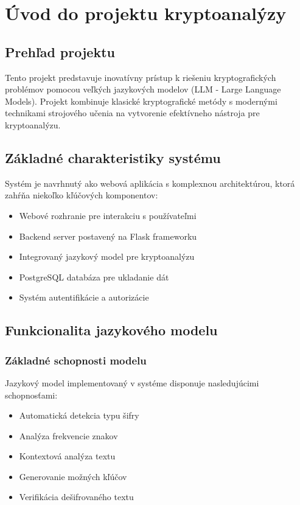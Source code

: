 \chapter{Úvod do projektu kryptoanalýzy}

\section{Prehľad projektu}
Tento projekt predstavuje inovatívny prístup k riešeniu kryptografických problémov pomocou veľkých jazykových modelov (LLM - Large Language Models). Projekt kombinuje klasické kryptografické metódy s modernými technikami strojového učenia na vytvorenie efektívneho nástroja pre kryptoanalýzu.

\section{Základné charakteristiky systému}
Systém je navrhnutý ako webová aplikácia s komplexnou architektúrou, ktorá zahŕňa niekoľko kľúčových komponentov:

\begin{itemize}
    \item Webové rozhranie pre interakciu s používateľmi
    \item Backend server postavený na Flask frameworku
    \item Integrovaný jazykový model pre kryptoanalýzu
    \item PostgreSQL databáza pre ukladanie dát
    \item Systém autentifikácie a autorizácie
\end{itemize}

\section{Funkcionalita jazykového modelu}
\subsection{Základné schopnosti modelu}
Jazykový model implementovaný v systéme disponuje nasledujúcimi schopnosťami:

\begin{itemize}
    \item Automatická detekcia typu šifry
    \item Analýza frekvencie znakov
    \item Kontextová analýza textu
    \item Generovanie možných kľúčov
    \item Verifikácia dešifrovaného textu
\end{itemize}

